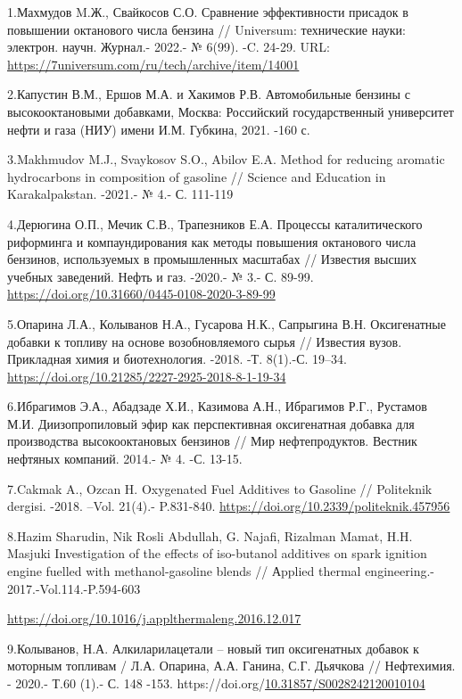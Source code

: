 \begin{references}
1.Махмудов M.Ж., Свайкосов С.О. Сравнение эффективности присадок в
повышении октанового числа бензина // Universum: технические науки:
электрон. научн. Журнал.- 2022.- № 6(99). -C. 24-29. URL:
\url{https://7universum.com/ru/tech/archive/item/14001}

2.Капустин В.М., Ершов М.А. и Хакимов Р.В. Автомобильные бензины с
высокооктановыми добавками, Москва: Российский государственный
университет нефти и газа (НИУ) имени И.М. Губкина, 2021. -160 с.

3.Makhmudov M.J., Svaykosov S.O., Abilov E.A. Method for reducing
aromatic hydrocarbons in composition of gasoline // Science and
Education in Karakalpakstan. -2021.- № 4.- С. 111-119

4.Дерюгина О.П., Мечик С.В., Трапезников Е.А. Процессы каталитического
риформинга и компаундирования как методы повышения октанового числа
бензинов, используемых в промышленных масштабах // Известия высших
учебных заведений. Нефть и газ. -2020.- № 3.- С. 89-99.
\url{https://doi.org/10.31660/0445-0108-2020-3-89-99}

5.Опарина Л.А., Колыванов Н.А., Гусарова Н.К., Сапрыгина В.Н.
Оксигенатные добавки к топливу на основе возобновляемого сырья //
Известия вузов. Прикладная химия и биотехнология. -2018. -Т. 8(1).-С.
19--34. \url{https://doi.org/10.21285/2227-2925-2018-8-1-19-34}

6.Ибрагимов Э.А., Абадзаде Х.И., Казимова А.Н., Ибрагимов Р.Г., Рустамов
М.И. Диизопропиловый эфир как перспективная оксигенатная добавка для
производства высокооктановых бензинов // Мир нефтепродуктов. Вестник
нефтяных компаний. 2014.- № 4. -С. 13-15.

7.Cakmak A., Ozcan H. Oxygenated Fuel Additives to Gasoline //
Politeknik dergisi. -2018. --Vol. 21(4).- P.831-840.
\url{https://doi.org/10.2339/politeknik.457956}

8.Hazim Sharudin, Nik Rosli Abdullah, G. Najafi, Rizalman Mamat, H.H.
Masjuki Investigation of the effects of iso-butanol additives on spark
ignition engine fuelled with methanol-gasoline blends // Аpplied thermal
engineering.- 2017.-Vol.114.-P.594-603

\url{https://doi.org/10.1016/j.applthermaleng.2016.12.017}

9.Колыванов, Н.А. Алкиларилацетали -- новый тип оксигенатных добавок к
моторным топливам / Л.А. Опарина, А.А. Ганина, С.Г. Дьячкова //
Нефтехимия. - 2020.- Т.60 (1).- С. 148 -153.
https://doi.org/\href{https://doi.org/10.31857/S0028242120010104}{10.31857/S0028242120010104}


\end{references}
